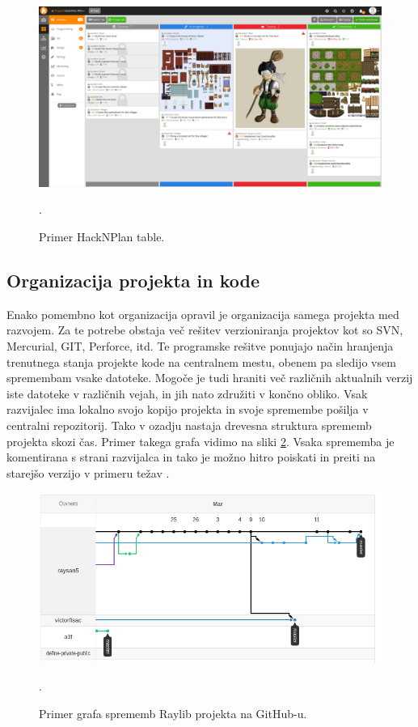 \documentclass[12pt,a4paper,twoside]{book}
\begin{document}
\begin{figure}[h]
	\centering
	\includegraphics[width=13cm]{hacknplanDemo}
	\caption{Primer HackNPlan table.}.
	\label{slika:hacknplanDemo}
	\vspace*{-2em}
\end{figure}

\subsection{Organizacija projekta in kode}
Enako pomembno kot organizacija opravil je organizacija samega projekta med razvojem. Za te potrebe obstaja več rešitev verzioniranja projektov kot so SVN, Mercurial, GIT, Perforce, itd. Te programske rešitve ponujajo način hranjenja trenutnega stanja projekte kode na centralnem mestu, obenem pa sledijo vsem spremembam vsake datoteke. Mogoče je tudi hraniti več različnih aktualnih verzij iste datoteke v različnih vejah, in jih nato združiti v končno obliko. Vsak razvijalec ima lokalno svojo kopijo projekta in svoje spremembe pošilja v centralni repozitorij. Tako v ozadju nastaja drevesna struktura sprememb projekta skozi čas. Primer takega grafa vidimo na sliki \ref{slika:gitGraph}. Vsaka sprememba je komentirana s strani razvijalca in tako je možno hitro poiskati in preiti na starejšo verzijo v primeru težav \cite{versionControl}.
	
\begin{figure}[h]
	\centering
	\includegraphics[width=13cm]{gitGraph}
	\caption{Primer grafa sprememb Raylib projekta na GitHub-u.}.
	\label{slika:gitGraph}
	\vspace*{-2em}
\end{figure}
\end{document}
